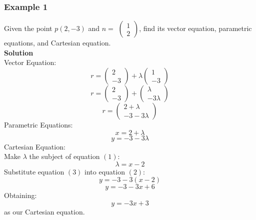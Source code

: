 \documentclass[hidelinks, a4paper, 12pt]{article}
\newcommand{\bd}{\textbf}
\newcommand{\nhat}{\hat{n}}
\newcommand{\n}{\\[\baselineskip]}
\begin{document}
            \subsubsection{Example 1}
                Given the point $p (2, -3)$ and $\nhat = $
                $\begin{pmatrix}
                    1 \\ 
                    2
                \end{pmatrix}$,
                find its vector equation, parametric equations, and Cartesian equation.\n
                \bd{Solution}\\
                Vector Equation:
                \[r = \begin{pmatrix} 2 \\ -3 \end{pmatrix} + \lambda \begin{pmatrix} 1 \\ -3 \end{pmatrix}\]
                \[r = \begin{pmatrix} 2 \\ -3 \end{pmatrix} + \begin{pmatrix} \lambda \\ -3\lambda \end{pmatrix}\]
                \[r = \begin{pmatrix} 2 + \lambda \\ -3-3\lambda \end{pmatrix}\]
                Parametric Equations:
                \begin{equation}
                    x = 2 + \lambda
                \end{equation}
                \begin{equation}
                    y = -3 - 3\lambda  
                \end{equation}
                Cartesian Equation:\n
                Make $\lambda$ the subject of equation $(1)$: 
                \begin{equation}
                    \lambda = x - 2
                \end{equation}
                Substitute equation $(3)$ into equation $(2)$:
                \[y = -3 - 3(x-2)\]
                \[y = -3 -3x + 6\]
                Obtaining:
                \[y = -3x + 3\]
                as our Cartesian equation.
\end{document}
